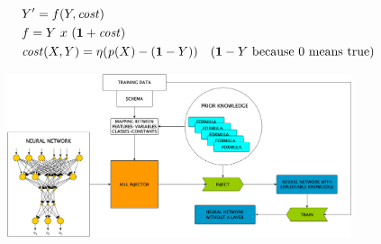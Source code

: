 \documentclass[presentation]{beamer}\mode<presentation>{\usetheme{AMSBolognaFC}}
\begin{document}
\begin{frame}[allowframebreaks]{\longkill}
    \begin{equation*}
        \centering
        \begin{aligned}
            &Y' = f(Y, \pred{cost})\\
            &f = Y\ x\ (\textbf{1} + \pred{cost})\\
            &\pred{cost}(X,Y) = \eta(\pred{p}(X) - (\textbf{1} - Y))\quad \text{(}\textbf{1} - Y\text{ because 0 means true)}\\
        \end{aligned}
    \end{equation*}
    
    \framebreak
    
    \begin{figure}
        \centering
        \includegraphics[width=0.9\textwidth]{figures/kill.png}
    \end{figure}
    
\end{frame}
\end{document}
